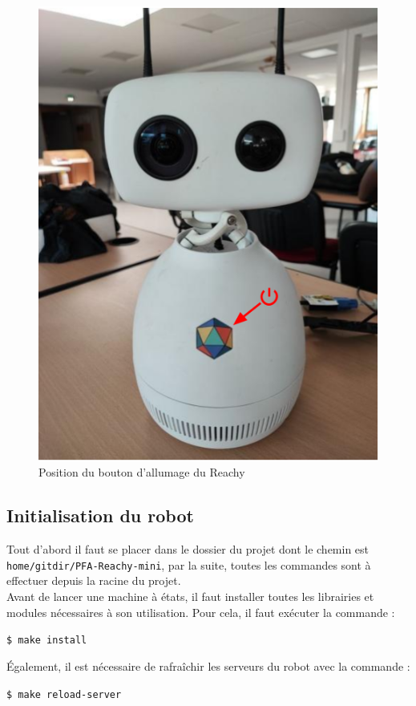 \documentclass[a4paper,french]{article}
\begin{document}
\begin{figure}[H]
    \centering
    \includegraphics[scale=0.35]{figures/allumage_reachy.png}
    \caption{Position du bouton d'allumage du Reachy}
    \label{fig:allumage}
\end{figure}
  
\subsection{Initialisation du robot}
Tout d'abord il faut se placer dans le dossier du projet dont le chemin est \texttt{home/gitdir/PFA-Reachy-mini}, par la suite, toutes les commandes sont à effectuer depuis la racine du projet. \\
Avant de lancer une machine à états, il faut installer toutes les librairies et modules nécessaires à son utilisation. Pour cela, il faut exécuter la commande :
\begin{center}
\texttt{\$ make install}
\end{center}

Également, il est nécessaire de rafraîchir les serveurs du robot avec la commande :
\begin{center}
\texttt{\$ make reload-server}
\end{center}
\end{document}
